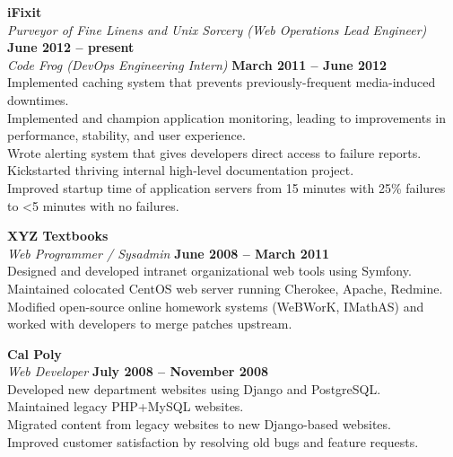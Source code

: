 \documentclass[margin,line]{resume}
\begin{document}
\begin{resume}
    \textbf{\listing iFixit} \vspace{2mm}\\\vspace{1mm}%
    \textsl{Purveyor of Fine Linens and Unix Sorcery (Web Operations Lead Engineer)} \hfill \textbf{June 2012 -- present}\\
    \textsl{Code Frog (DevOps Engineering Intern)} \hfill \textbf{March 2011 -- June 2012}\\
    Implemented caching system that prevents previously-frequent media-induced downtimes.\\
    Implemented and champion application monitoring, leading to improvements in performance, stability, and user experience.\\
    Wrote alerting system that gives developers direct access to failure reports.\\
    Kickstarted thriving internal high-level documentation project.\\
    Improved startup time of application servers from 15 minutes with 25\% failures to \textless5 minutes with no failures.

    \textbf{\listing XYZ Textbooks} \vspace{2mm}\\\vspace{1mm}%
    \textsl{Web Programmer / Sysadmin} \hfill \textbf{June 2008 -- March 2011}\\
    Designed and developed intranet organizational web tools using Symfony.\\
    Maintained colocated CentOS web server running Cherokee, Apache, Redmine.\\
    Modified open-source online homework systems (WeBWorK, IMathAS) and worked with developers to merge patches upstream.
    
    \textbf{\listing Cal Poly} \vspace{2mm}\\\vspace{1mm}%
    \textsl{Web Developer} \hfill \textbf{July 2008 -- November 2008}\\
    Developed new department websites using Django and PostgreSQL.\\
    Maintained legacy PHP+MySQL websites.\\
    Migrated content from legacy websites to new Django-based websites.\\
    Improved customer satisfaction by resolving old bugs and feature requests.


\end{resume}
\end{document}
